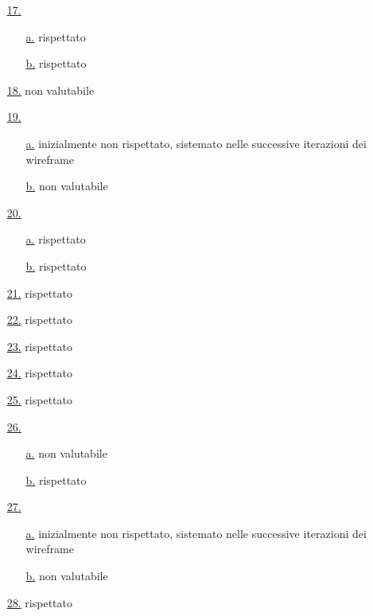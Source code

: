 \begin{itemize}
    \item[{\hyperref[lg:17]{17.}}] \begin{itemize}
        \item[{\hyperref[lg:17.a]{a.}}] rispettato
        \item[{\hyperref[lg:17.b]{b.}}] rispettato
    \end{itemize}
    \item[{\hyperref[lg:18]{18.}}] non valutabile
    \item[{\hyperref[lg:19]{19.}}] \begin{itemize}
        \item[{\hyperref[lg:19.a]{a.}}] inizialmente non rispettato, sistemato nelle successive iterazioni dei wireframe
        \item[{\hyperref[lg:19.b]{b.}}] non valutabile
    \end{itemize}
    \item[{\hyperref[lg:20]{20.}}] \begin{itemize}
        \item[{\hyperref[lg:20.a]{a.}}] rispettato
        \item[{\hyperref[lg:20.b]{b.}}] rispettato
    \end{itemize}
    \item[{\hyperref[lg:21]{21.}}] rispettato
    \item[{\hyperref[lg:22]{22.}}] rispettato
    \item[{\hyperref[lg:23]{23.}}] rispettato
    \item[{\hyperref[lg:24]{24.}}] rispettato
    \item[{\hyperref[lg:25]{25.}}] rispettato
    \item[{\hyperref[lg:26]{26.}}] \begin{itemize}
        \item[{\hyperref[lg:26.a]{a.}}] non valutabile
        \item[{\hyperref[lg:26.b]{b.}}] rispettato
    \end{itemize}
    \item[{\hyperref[lg:27]{27.}}] \begin{itemize}
        \item[{\hyperref[lg:27.a]{a.}}] inizialmente non rispettato, sistemato nelle successive iterazioni dei wireframe
        \item[{\hyperref[lg:27.b]{b.}}] non valutabile
    \end{itemize}
    \item[{\hyperref[lg:28]{28.}}] rispettato

\end{itemize}
